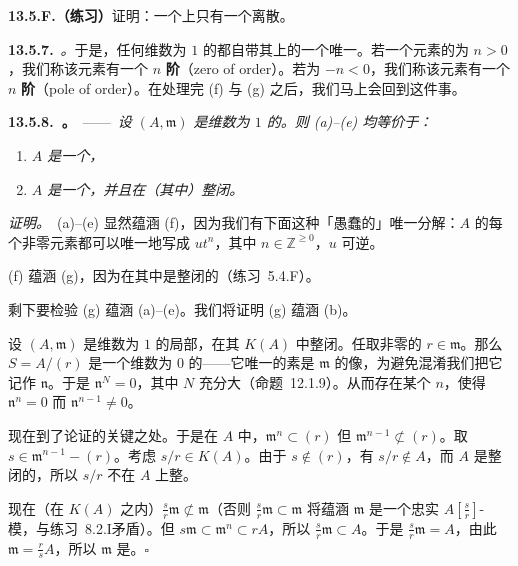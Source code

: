 \textbf{13.5.F.（练习）}\quad 证明：一个\trDVR{}上只有一个离散\trValuation。

\textbf{13.5.7.}\ \emph{\trhDefinition{}。}\quad 于是，任何维数为 $1$ 的\trRegular\trLocalRing{}都自带其\trFractionField{}上的一个唯一\trValuation。若一个元素的\trValuation{}为 $n>0$，我们称该元素有一个 $n$ \textbf{阶\trZeros}（zero of order）。若\trValuation{}为 $-n<0$，我们称该元素有一个 $n$ \textbf{阶\trPole}（pole of order）。在处理完 (f) 与 (g) 之后，我们马上会回到这件事。

\textbf{13.5.8.\ \trhTheorem{}。}\ ——\ \emph{设 $(A,\mathfrak{m})$ 是维数为 $1$ 的\trNoetherian\trLocalRing。则 (a)--(e) 均等价于：}
\begin{enumerate}[label=(\alph*),start=6]
\item \emph{$A$ 是一个\trUFD，}
\item \emph{$A$ 是一个\trIntegralDomain，并且在（其\trFractionField{}中）整闭。}
\end{enumerate}

\emph{证明。}\ (a)--(e) 显然蕴涵 (f)，因为我们有下面这种「愚蠢的」唯一分解：$A$ 的每个非零元素都可以唯一地写成 $ut^n$，其中 $n\in\mathbb{Z}^{\ge0}$，$u$ 可逆。

(f) 蕴涵 (g)，因为\trUFD{}在其\trFractionField{}中是整闭的（\mbox{练习~5.4.F}）。

剩下要检验 (g) 蕴涵 (a)--(e)。我们将证明 (g) 蕴涵 (b)。

设 $(A,\mathfrak{m})$ 是维数为 $1$ 的\trNoetherian{}局部\trIntegralDomain，在其\trFractionField{} $K(A)$ 中整闭。任取非零的 $r\in\mathfrak{m}$。那么 $S=A/(r)$ 是一个维数为 $0$ 的\trNoetherian\trLocalRing——它唯一的素是 $\mathfrak{m}$ 的像，为避免混淆我们把它记作 $\mathfrak{n}$。于是 $\mathfrak{n}^N=0$，其中 $N$ 充分大（命题~12.1.9）。从而存在某个 $n$，使得 $\mathfrak{n}^n=0$ 而 $\mathfrak{n}^{n-1}\neq0$。

现在到了论证的关键之处。于是在 $A$ 中，$\mathfrak{m}^n\subset(r)$ 但 $\mathfrak{m}^{n-1}\not\subset(r)$。取 $s\in\mathfrak{m}^{n-1}-(r)$。考虑 $s/r\in K(A)$。由于 $s\notin(r)$，有 $s/r\notin A$，而 $A$ 是整闭的，所以 $s/r$ 不在 $A$ 上整。

现在（在 $K(A)$ 之内）$\frac{s}{r}\mathfrak{m}\not\subset\mathfrak{m}$（否则 $\frac{s}{r}\mathfrak{m}\subset\mathfrak{m}$ 将蕴涵 $\mathfrak{m}$ 是一个忠实 $A[\frac{s}{r}]$-模，与\mbox{练习~8.2.I}矛盾）。但 $s\mathfrak{m}\subset\mathfrak{m}^n\subset rA$，所以 $\frac{s}{r}\mathfrak{m}\subset A$。于是 $\frac{s}{r}\mathfrak{m}=A$，由此 $\mathfrak{m}=\frac{r}{s}A$，所以 $\mathfrak{m}$ 是\trPrincipalIdeal。\hfill$\square$

